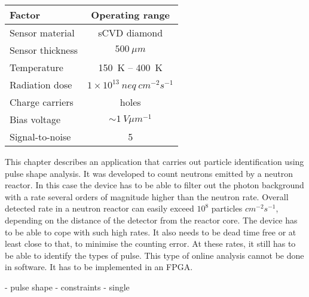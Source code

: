 \documentclass[12pt]{mytustyle}  %
\begin{document}

\begin{center}
\begin{tabular}{l*{1}{c}}
Factor              & Operating range \\
\hline
Sensor material & sCVD diamond \\
Sensor thickness & $500~\mu m$ \\
Temperature & 150~K -- 400~K \\
Radiation dose & $1\times10^{13}~neq~cm^{-2} s^{-1}$ \\
Charge carriers & holes \\
Bias voltage & $\sim1~V \mu m^{-1}$ \\
Signal-to-noise & 5 \\
\end{tabular}
\label{tab:limits}
\end{center}




This chapter describes an application that carries out particle identification using pulse shape analysis. It was developed to count neutrons emitted by a neutron reactor. In this case the device has to be able to filter out the photon background with a rate several orders of magnitude higher than the neutron rate. Overall detected rate in a neutron reactor can easily exceed $10^8$ particles $cm^{-2}s^{-1}$, depending on the distance of the detector from the reactor core. The device has to be able to cope with such high rates. It also needs to be dead time free or at least close to that, to minimise the counting error. At these rates, it still has to be able to identify the types of pulse. This type of online analysis cannot be done in software. It has to be implemented in an FPGA.










- pulse shape
- constraints
- single






\clearpage
\end{document}
